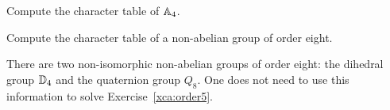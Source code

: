 \begin{exercise}
    Compute the character table of $\mathbb{A}_4$. 
\end{exercise}

\begin{exercise}
\label{xca:order5}
    Compute the character table of a non-abelian group of order eight.
\end{exercise}

There are two non-isomorphic non-abelian groups of order eight: the dihedral group $\mathbb{D}_4$ and the quaternion group $Q_8$. One does not need
to use this information to solve Exercise~\ref{xca:order5}.



	
